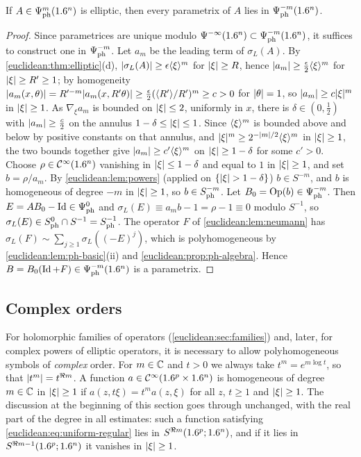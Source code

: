 \begin{proposition}\label{euclidean:prop:ph-parametrix}
  If $A\in\Psi^{m}_{\mathrm{ph}}(1.6^n)$ is elliptic, then every parametrix of
  $A$ lies in $\Psi^{-m}_{\mathrm{ph}}(1.6^n)$.
\end{proposition}
\begin{proof}
  Since parametrices are unique modulo
  $\Psi^{-\infty}(1.6^n)\subset\Psi^{-m}_{\mathrm{ph}}(1.6^n)$, it suffices to
  construct one in $\Psi^{-m}_{\mathrm{ph}}$. Let $a_m$ be the leading term
  of $\sigma_L(A)$. By \cref{euclidean:thm:elliptic}(d),
  $\lvert \sigma_L(A)\rvert\ge\epsilon\langle \xi\rangle^m$ for $\lvert \xi\rvert\ge R$, hence
  $\lvert a_m\rvert\ge\frac{\epsilon}2\langle \xi\rangle^m$ for $\lvert \xi\rvert\ge R'\ge1$; by homogeneity
  $\lvert a_m(x,\theta)\rvert=R'^{-m}\lvert a_m(x,R'\theta)\rvert\ge\frac{\epsilon}2(\langle R'\rangle/R')^m\ge c>0$
  for $\lvert \theta\rvert=1$, so $\lvert a_m\rvert\ge c\lvert \xi\rvert^m$ in $\lvert \xi\rvert\ge1$. As
  $\nabla_\xi a_m$ is bounded on $\lvert \xi\rvert\le2$, uniformly in $x$, there is
  $\delta\in(0,\frac12)$ with $\lvert a_m\rvert\ge\frac c2$ on the annulus
  $1-\delta\le\lvert \xi\rvert\le1$. Since $\langle \xi\rangle^m$ is bounded above and below by positive
  constants on that annulus, and $\lvert \xi\rvert^m\ge2^{-\lvert m\rvert/2}\langle \xi\rangle^m$ in $\lvert \xi\rvert\ge1$,
  the two bounds together give $\lvert a_m\rvert\ge c'\langle \xi\rangle^m$ on $\lvert \xi\rvert\ge1-\delta$ for
  some $c'>0$. Choose $\rho\in\mathcal{C}^\infty(1.6^n)$
  vanishing in $\lvert \xi\rvert\le1-\delta$ and equal to $1$ in $\lvert \xi\rvert\ge1$, and set
  $b=\rho/a_m$. By \cref{euclidean:lem:powers} (applied on
  $\{\lvert \xi\rvert>1-\delta\}$) $b\in S^{-m}$, and $b$ is homogeneous of degree $-m$ in
  $\lvert \xi\rvert\ge1$, so $b\in S^{-m}_{\mathrm{ph}}$. Let $B_0=\operatorname{Op}(b)\in\Psi^{-m}_{\mathrm{ph}}$.
  Then $E=AB_0-\operatorname{Id}\in\Psi^{0}_{\mathrm{ph}}$ and
  $\sigma_L(E)\equiv a_mb-1=\rho-1\equiv0$ modulo $S^{-1}$, so
  $\sigma_L(E)\in S^{0}_{\mathrm{ph}}\cap S^{-1}=S^{-1}_{\mathrm{ph}}$. The operator $F$ of
  \cref{euclidean:lem:neumann} has
  $\sigma_L(F)\sim\sum_{j\ge1}\sigma_L((-E)^j)$, which is polyhomogeneous by
  \cref{euclidean:lem:ph-basic}(ii) and \cref{euclidean:prop:ph-algebra}.
  Hence $B=B_0(\operatorname{Id}+F)\in\Psi^{-m}_{\mathrm{ph}}(1.6^n)$ is a parametrix.
\end{proof}

\subsection{Complex orders}\label{euclidean:sec:complex-order}

For holomorphic families of operators (\cref{euclidean:sec:families}) and,
later, for complex powers of elliptic operators, it is necessary to allow
polyhomogeneous symbols of \emph{complex} order. For $m\in\mathbb{C}$ and $t>0$ we
always take $t^m=e^{m\log t}$, so that $\lvert t^m\rvert=t^{\Re m}$. A function
$a\in\mathcal{C}^\infty(1.6^p\times1.6^n)$ is homogeneous of degree $m\in\mathbb{C}$ in $\lvert \xi\rvert\ge1$
if $a(z,t\xi)=t^ma(z,\xi)$ for all $z$, $t\ge1$ and $\lvert \xi\rvert\ge1$. The
discussion at the beginning of this section goes through unchanged, with the
real part of the degree in all estimates: such a function satisfying
\eqref{euclidean:eq:uniform-regular} lies in $S^{\Re m}(1.6^p;1.6^n)$, and if it
lies in $S^{\Re m-1}(1.6^p;1.6^n)$ it vanishes in $\lvert \xi\rvert\ge1$.

